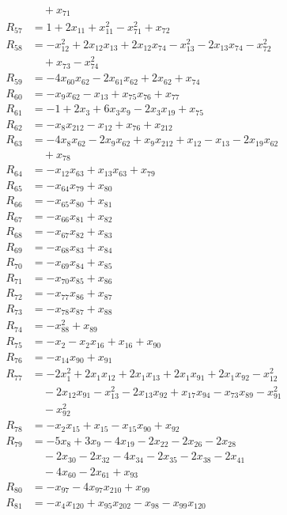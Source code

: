 \begin{align*}
&\quad{}+x_{71}\\
R_{57}&=1+2x_{11}+x_{11}^{2}-x_{71}^{2}+x_{72}\\
R_{58}&=-x_{12}^{2}+2x_{12}x_{13}+2x_{12}x_{74}-x_{13}^{2}-2x_{13}x_{74}-x_{72}^{2}\\
&\quad{}+x_{73}-x_{74}^{2}\\
R_{59}&=-4x_{60}x_{62}-2x_{61}x_{62}+2x_{62}+x_{74}\\
R_{60}&=-x_{9}x_{62}-x_{13}+x_{75}x_{76}+x_{77}\\
R_{61}&=-1+2x_{3}+6x_{3}x_{9}-2x_{3}x_{19}+x_{75}\\
R_{62}&=-x_{8}x_{212}-x_{12}+x_{76}+x_{212}\\
R_{63}&=-4x_{8}x_{62}-2x_{9}x_{62}+x_{9}x_{212}+x_{12}-x_{13}-2x_{19}x_{62}\\
&\quad{}+x_{78}\\
R_{64}&=-x_{12}x_{63}+x_{13}x_{63}+x_{79}\\
R_{65}&=-x_{64}x_{79}+x_{80}\\
R_{66}&=-x_{65}x_{80}+x_{81}\\
R_{67}&=-x_{66}x_{81}+x_{82}\\
R_{68}&=-x_{67}x_{82}+x_{83}\\
R_{69}&=-x_{68}x_{83}+x_{84}\\
R_{70}&=-x_{69}x_{84}+x_{85}\\
R_{71}&=-x_{70}x_{85}+x_{86}\\
R_{72}&=-x_{77}x_{86}+x_{87}\\
R_{73}&=-x_{78}x_{87}+x_{88}\\
R_{74}&=-x_{88}^{2}+x_{89}\\
R_{75}&=-x_{2}-x_{2}x_{16}+x_{16}+x_{90}\\
R_{76}&=-x_{14}x_{90}+x_{91}\\
R_{77}&=-2x_{1}^{2}+2x_{1}x_{12}+2x_{1}x_{13}+2x_{1}x_{91}+2x_{1}x_{92}-x_{12}^{2}\\
&\quad{}-2x_{12}x_{91}-x_{13}^{2}-2x_{13}x_{92}+x_{17}x_{94}-x_{73}x_{89}-x_{91}^{2}\\
&\quad{}-x_{92}^{2}\\
R_{78}&=-x_{2}x_{15}+x_{15}-x_{15}x_{90}+x_{92}\\
R_{79}&=-5x_{8}+3x_{9}-4x_{19}-2x_{22}-2x_{26}-2x_{28}\\
&\quad{}-2x_{30}-2x_{32}-4x_{34}-2x_{35}-2x_{38}-2x_{41}\\
&\quad{}-4x_{60}-2x_{61}+x_{93}\\
R_{80}&=-x_{97}-4x_{97}x_{210}+x_{99}\\
R_{81}&=-x_{4}x_{120}+x_{95}x_{202}-x_{98}-x_{99}x_{120}\\

\end{align*}
